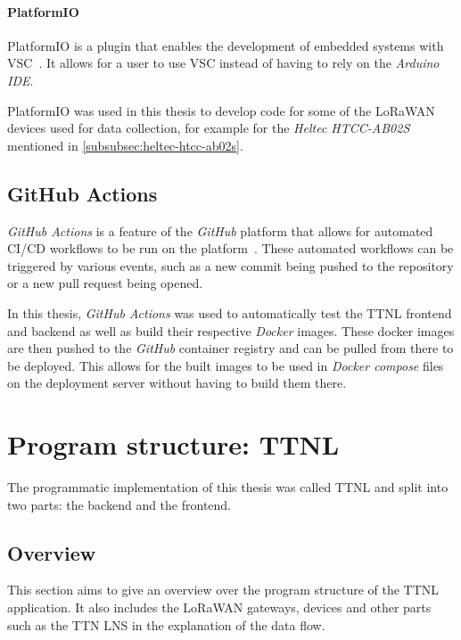 \paragraph{PlatformIO}

PlatformIO is a plugin that enables the development of embedded systems with \ac{VSC}~\cite{platformio_platformio_nodate}.
It allows for a user to use \ac{VSC} instead of having to rely on the \emph{Arduino IDE}.

PlatformIO was used in this thesis to develop code for some of the \ac{LoRaWAN} devices used for data collection, for example for the \emph{Heltec HTCC-AB02S} mentioned in \cref{subsubsec:heltec-htcc-ab02s}.

\subsection{GitHub Actions}

\emph{GitHub Actions} is a feature of the \emph{GitHub} platform that allows for automated \ac{CI/CD} workflows to be run on the platform~\cite{github_inc_features_2023}.
These automated workflows can be triggered by various events, such as a new commit being pushed to the repository or a new pull request being opened.

In this thesis, \emph{GitHub Actions} was used to automatically test the \ac{TTNL} frontend and backend as well as build their respective \emph{Docker} images.
These docker images are then pushed to the \emph{GitHub} container registry and can be pulled from there to be deployed.
This allows for the built images to be used in \emph{Docker compose} files on the deployment server without having to build them there.

\section{Program structure: \acf{TTNL}}\label{section:ttnl}

The programmatic implementation of this thesis was called \acf{TTNL} and split into two parts: the backend and the frontend.

\subsection{Overview}

This section aims to give an overview over the program structure of the \ac{TTNL} application.
It also includes the \ac{LoRaWAN} gateways, devices and other parts such as the \ac{TTN} \ac{LNS} in the explanation of the data flow.

